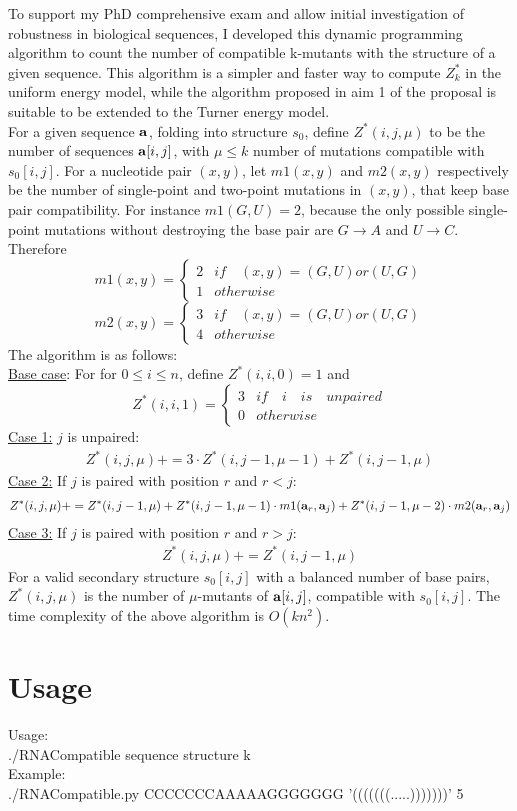 \documentclass[11pt,notitlepage]{article}
\newcommand{\aseq}{{\bf a}\xspace}
\begin{document}

To support my PhD comprehensive exam and allow initial investigation of robustness in biological sequences, I developed this dynamic programming algorithm to count the number of compatible k-mutants with the structure of a given sequence. This algorithm is a simpler and faster way to compute $Z^*_k$ in the uniform energy model, while the algorithm proposed in aim 1 of the proposal is suitable to be extended to the Turner energy model.\\
For a given sequence $\aseq$, folding into structure $s_0$, define $Z^*(i,j,\mu)$ to be the number of sequences $\aseq[i,j]$, with $\mu \leq k$ number of mutations compatible with $s_0[i,j]$. For a nucleotide pair $(x,y)$, let $m1(x,y)$ and $m2(x,y)$ respectively be the number of single-point and two-point mutations in $(x,y)$, that keep base pair compatibility. For instance $m1(G,U)=2$, because the only possible single-point mutations without destroying the base pair are $G\to A$ and $U\to C$. Therefore
\[ m1(x,y) = \begin{cases} 
      2 & if \quad (x,y)=(G,U) or (U,G) \\
      1 & otherwise
   \end{cases}
\]
\[ m2(x,y) = \begin{cases} 
      3 & if \quad (x,y)=(G,U) or (U,G) \\
      4 & otherwise
   \end{cases}
\]
The algorithm is as follows:\\
\underline{Base case}: For for $0\leq i \leq n$, define $Z^*(i,i,0)=1$ and 
\[ Z^*(i,i,1) = \begin{cases} 
      3 & if \quad i \quad is \quad unpaired  \\
      0 & otherwise
   \end{cases}
\]
\underline{Case 1:} $j$ is unpaired:
\begin{eqnarray}
Z^*(i,j,\mu) += 3 \cdot Z^*(i,j-1,\mu-1) + Z^*(i,j-1,\mu)
\end{eqnarray}
\underline{Case 2:} If $j$ is paired with position $r$ and $r<j$:
\begin{eqnarray}
Z^*(i,j,\mu) += Z^*(i,j-1,\mu) + Z^*(i,j-1,\mu-1) \cdot m1(\aseq_r,\aseq_j) +  Z^*(i,j-1,\mu-2) \cdot m2(\aseq_r,\aseq_j)
\end{eqnarray}
\underline{Case 3:} If $j$ is paired with position $r$ and $r>j$:
\begin{eqnarray}
Z^*(i,j,\mu) += Z^*(i,j-1,\mu)
\end{eqnarray}
For a valid secondary structure $s_0[i,j]$ with a balanced number of base pairs, $Z^*(i,j,\mu)$ is the number of $\mu$-mutants of $\aseq[i,j]$, compatible with $s_0[i,j]$. The time complexity of the above algorithm is $O(k n^2)$.

\section*{Usage}
Usage:\\ 
\qquad\qquad ./RNACompatible sequence structure k\\

Example:\\
\qquad\qquad ./RNACompatible.py  CCCCCCCAAAAAGGGGGGG '(((((((.....)))))))' 5\\
\end{document}

